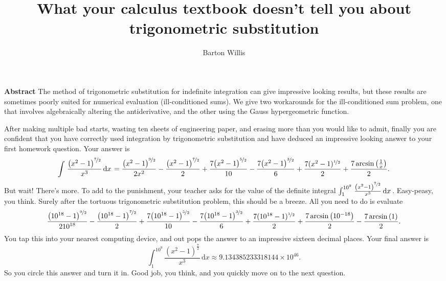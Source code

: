 \documentclass[12pt,fleqn]{article}
\title{What your calculus textbook doesn't tell you about trigonometric substitution}
\author{Barton Willis}
\newcounter{ex}\setcounter{ex}{0}
\begin{document}
\maketitle

\begin{shaded}
  \noindent \textbf{Abstract} The method of trigonometric substitution for indefinite
  integration can give impressive looking results, but these results 
  are sometimes poorly suited for numerical evaluation (ill-conditioned sums).  
  We give two workarounds for the ill-conditioned sum problem, one that involves algebraically 
  altering the antiderivative, and the other using the Gauss hypergeometric function.
\end{shaded}

After making multiple bad starts, wasting ten sheets of engineering paper, 
 and erasing more  than you would like to admit, finally you are confident 
 that you have correctly used integration by trigonometric substitution and have
 deduced an impressive looking answer to your first homework question. Your answer
 is
 \begin{equation*}
    \int {\left. \frac{{{\left( {{x}^{2}}-1\right) }^{\nicefrac{7}{2}}}}{{{x}^{3}}} \, \mathrm{d}x\right.}=\frac{{{\left( {{x}^{2}}-1\right) }^{\nicefrac{9}{2}}}}{2 {{x}^{2}}}-\frac{{{\left( {{x}^{2}}-1\right) }^{\nicefrac{7}{2}}}}{2}+\frac{7 {{\left( {{x}^{2}}-1\right) }^{\nicefrac{5}{2}}}}{10}-\frac{7 {{\left( {{x}^{2}}-1\right) }^{\nicefrac{3}{2}}}}{6}+\frac{7 (x^2-1)^{\nicefrac{1}{2}}}{2}+\frac{7 \operatorname{arcsin}\left( \frac{1}{x}\right) }{2}.
\end{equation*}
But wait! There's more. To add to the punishment, your teacher asks for the value of  
the definite integral $\int_1^{10^9} {\left. \frac{{{\left( {{x}^{2}}-1\right) }^{\nicefrac{7}{2}}}}{{{x}^{3}}} \, \mathrm{d}x\right.}$. Easy-peasy, you think.
Surely after the tortuous trigonometric substitution problem, this should be a breeze. 
All you need to do is evaluate
\begin{equation*}
  \frac{{{\left( {{10}^{18}}-1\right) }^{\nicefrac{9}{2}}}}{2 {{10}^{18}}}-\frac{{{\left( {{10}^{18}}-1\right) }^{\nicefrac{7}{2}}}}{2}+\frac{7 {{\left( {{10}^{18}}-1\right) }^{\nicefrac{5}{2}}}}{10}-\frac{7 {{\left( {{10}^{18}}-1\right) }^{\nicefrac{3}{2}}}}{6}+\frac{7 (10^{18}-1)^{\nicefrac{1}{2}}}{2}+\frac{7 \operatorname{arcsin}\left( 10^{-18}\right) }{2}
    - \frac{7 \operatorname{arcsin}\left( 1 \right) }{2}.
\end{equation*}
You tap this into your nearest computing device, and out  pops the answer to an 
impressive sixteen decimal places. Your final answer is
\begin{equation*}
    \int_1^{10^9} {\left. \frac{{{\left( {{x}^{2}}-1\right) }^{\frac{7}{2}}}}{{{x}^{3}}} \, \mathrm{d}x\right.}
       \approx 9.134385233318144 \times {{10}^{46}}.
\end{equation*}
So you circle this answer and turn it in. Good job, you think, and you
quickly move on to the next question.
\end{document}

